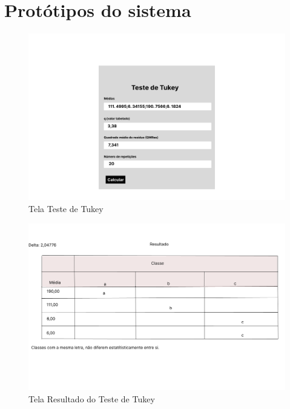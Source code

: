 \chapter{Protótipos do sistema}


\begin{figure}[H]
  \centering
  \includegraphics[width=0.8\linewidth]{imagens/tela1.png} 
  \caption{Tela Teste de Tukey}
  \label{fig:exemplo}
\end{figure}

\begin{figure}[H]
  \centering
  \includegraphics[width=0.8\linewidth]{imagens/tela2.png}
  \caption{Tela Resultado do Teste de Tukey}
  \label{fig:exemplo}
\end{figure}
